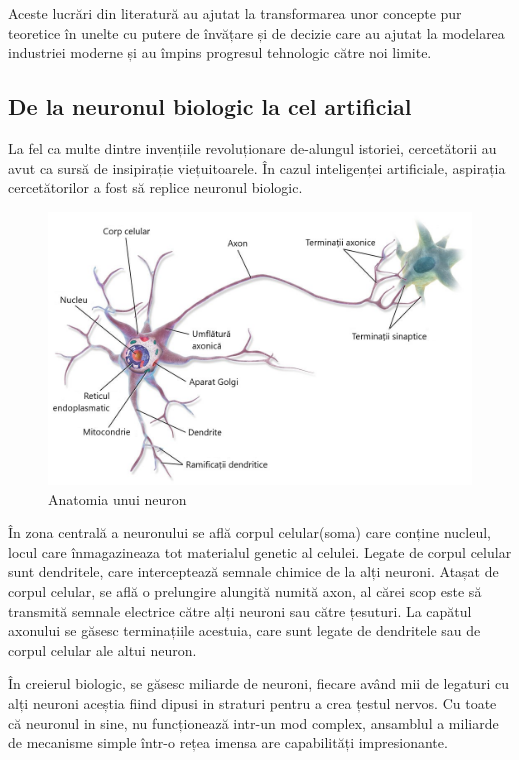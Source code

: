 Aceste lucrări din literatură au ajutat la transformarea unor concepte pur teoretice în unelte cu putere de învățare și de decizie care au ajutat la modelarea industriei moderne și au împins progresul tehnologic către noi limite. 

\subsection{De la neuronul biologic la cel artificial}
    La fel ca multe dintre invențiile revoluționare de-alungul istoriei, cercetătorii au avut ca sursă de insipirație viețuitoarele. În cazul inteligenței artificiale, aspirația cercetătorilor a fost să replice neuronul biologic. 
    
    \begin{figure}[h]
         \centering 
         \includegraphics[width=.75\textwidth]{images/structura-unui-neuron.jpg}
         \caption{Anatomia unui neuron \cite{neuron-anatomy}}
    \end{figure}
    
    În zona centrală a neuronului se află corpul celular(soma) care conține nucleul, locul care înmagazineaza tot materialul genetic al celulei. Legate de corpul celular sunt dendritele, care interceptează semnale chimice de la alți neuroni. Atașat de corpul celular, se află o prelungire alungită numită axon, al cărei scop este să transmită semnale electrice către alți neuroni sau către țesuturi. La capătul axonului se găsesc terminațiile acestuia, care sunt legate de dendritele sau de corpul celular ale altui neuron. 

    În creierul biologic, se găsesc miliarde de neuroni, fiecare având mii de legaturi cu alți neuroni aceștia fiind dipusi in straturi pentru a crea țestul nervos. Cu toate că neuronul in sine, nu funcționează intr-un mod complex, ansamblul a miliarde de mecanisme simple într-o rețea imensa are capabilități impresionante. 
    
    


